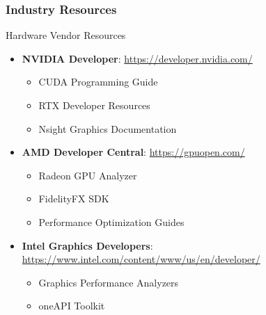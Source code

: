 \begin{frame}
\frametitle{Industry Resources}

\begin{conceptbox}{Hardware Vendor Resources}
\begin{itemize}
    \item \textbf{NVIDIA Developer}: \url{https://developer.nvidia.com/}
          \begin{itemize}
              \item CUDA Programming Guide
              \item RTX Developer Resources
              \item Nsight Graphics Documentation
          \end{itemize}
    \item \textbf{AMD Developer Central}: \url{https://gpuopen.com/}
          \begin{itemize}
              \item Radeon GPU Analyzer
              \item FidelityFX SDK
              \item Performance Optimization Guides
          \end{itemize}
    \item \textbf{Intel Graphics Developers}: \url{https://www.intel.com/content/www/us/en/developer/}
          \begin{itemize}
              \item Graphics Performance Analyzers
              \item oneAPI Toolkit
          \end{itemize}
\end{itemize}
\end{conceptbox}

\end{frame}

